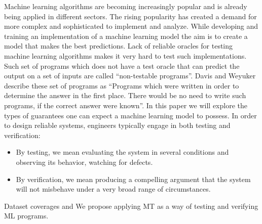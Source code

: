 Machine learning algorithms are becoming increasingly popular and is already being applied in different sectors. The rising popularity has created a demand for more complex and sophisticated  to implement and analyze. While developing and training an implementation of a machine learning model the aim is to create a model that makes the best predictions.
Lack of reliable oracles for testing machine learning algorithms makes it very hard to test such implementations. Such set of programs which does not have a test oracle that can predict the output on a set of inputs are called \enquote{non-testable programs}\cite{Murphy}. Davis and Weyuker describe these set of programs as \enquote{Programs which were written in order to determine the answer in the first place. There would be no need to write such programs, if the correct answer were known}.
In this paper we will explore the types of guarantees one can expect a machine learning model to possess.
In order to design reliable systems, engineers typically engage in both testing and verification:
\begin{itemize}
  \item By testing, we mean evaluating the system in several conditions and observing its behavior, watching for defects.

  \item By verification, we mean producing a compelling argument that the system will not misbehave under a very broad range of circumstances.
\end{itemize}

Dataset coverages
and
We propose applying MT as a way of testing and verifying ML programs.

